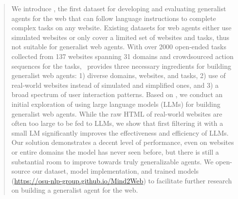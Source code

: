 
\begin{abstract}

We introduce \mind, the first dataset for developing and evaluating generalist agents for the web that can follow language instructions to complete complex tasks on any website.
Existing datasets for web agents either use simulated websites or only cover a limited set of websites and tasks, thus not suitable for generalist web agents.
With over \num{2000} open-ended tasks collected from \num{137} websites spanning \num{31} domains and crowdsourced action sequences for the tasks, \mind\ provides three necessary ingredients for building generalist web agents: 1) diverse domains, websites, and tasks, 2) use of real-world websites instead of simulated and simplified ones, and 3) a broad spectrum of user interaction patterns. 
Based on \mind, we conduct an initial exploration of using large language models (LLMs) for building generalist web agents.
While the raw HTML of real-world websites are often too large to be fed to LLMs, we show that first filtering it with a small LM significantly improves the effectiveness and efficiency of LLMs. 
Our solution demonstrates a decent level of performance, even on websites or entire domains the model has never seen before, but there is still a substantial room to improve towards truly generalizable agents.
We open-source our dataset, model implementation, and trained models ({{\small \url{https://osu-nlp-group.github.io/Mind2Web}}}) to facilitate further research on building a generalist agent for the web. 
\end{abstract}
